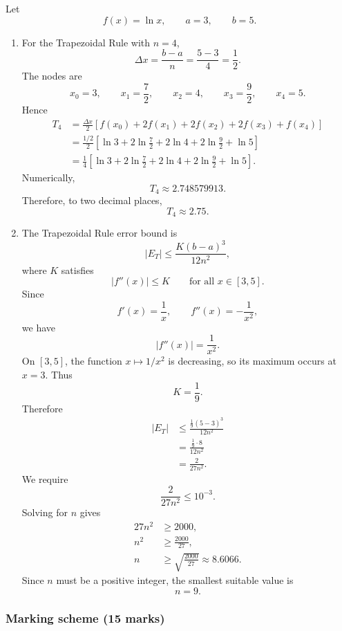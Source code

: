 \documentclass[12pt]{article}
\begin{document}
Let
\[
f(x)=\ln x,\qquad a=3,\qquad b=5.
\]

\begin{enumerate}[label=(\alph*)]
\item For the Trapezoidal Rule with $n=4$,
\[
\Delta x=\frac{b-a}{n}=\frac{5-3}{4}=\frac12.
\]
The nodes are
\[
x_0=3,\qquad x_1=\frac72,\qquad x_2=4,\qquad x_3=\frac92,\qquad x_4=5.
\]
Hence
\begin{align*}
T_4
&=\frac{\Delta x}{2}\left[f(x_0)+2f(x_1)+2f(x_2)+2f(x_3)+f(x_4)\right] \\
&=\frac{1/2}{2}\left[\ln 3+2\ln\frac72+2\ln 4+2\ln\frac92+\ln 5\right] \\
&=\frac14\left[\ln 3+2\ln\frac72+2\ln 4+2\ln\frac92+\ln 5\right].
\end{align*}
Numerically,
\[
T_4\approx 2.748579913.
\]
Therefore, to two decimal places,
\[
\boxed{T_4\approx 2.75.}
\]

\item The Trapezoidal Rule error bound is
\[
|E_T|\le \frac{K(b-a)^3}{12n^2},
\]
where $K$ satisfies
\[
|f''(x)|\le K
\qquad\text{for all }x\in[3,5].
\]
Since
\[
f'(x)=\frac1x,\qquad f''(x)=-\frac1{x^2},
\]
we have
\[
|f''(x)|=\frac1{x^2}.
\]
On $[3,5]$, the function $x\mapsto 1/x^2$ is decreasing, so its maximum occurs at $x=3$. Thus
\[
K=\frac19.
\]
Therefore
\begin{align*}
|E_T|
&\le \frac{\frac19(5-3)^3}{12n^2} \\
&=\frac{\frac19\cdot 8}{12n^2} \\
&=\frac{2}{27n^2}.
\end{align*}
We require
\[
\frac{2}{27n^2}\le 10^{-3}.
\]
Solving for $n$ gives
\begin{align*}
27n^2 &\ge 2000,\\
n^2 &\ge \frac{2000}{27},\\
n &\ge \sqrt{\frac{2000}{27}}\approx 8.6066.
\end{align*}
Since $n$ must be a positive integer, the smallest suitable value is
\[
\boxed{n=9.}
\]
\end{enumerate}

\subsubsection{Marking scheme (15 marks)}
\end{document}
